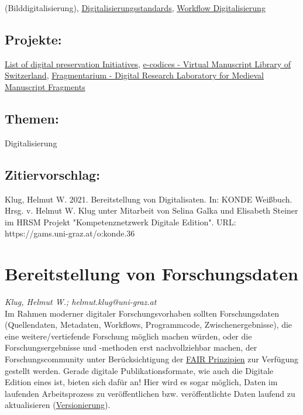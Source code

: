 \documentclass{article}
\begin{document}
{                           (Bilddigitalisierung)}, \href{https://gams.uni-graz.at/o:konde.64}{Digitalisierungsstandards}, \href{https://gams.uni-graz.at/archive/objects/context:konde/methods/sdef:Context/get?mode=workflow}{Workflow Digitalisierung}\subsection*{Projekte:}\href{https://en.wikipedia.org/wiki/List_of_digital_preservation_initiatives}{List of digital preservation Initiatives}, \href{https://www.e-codices.unifr.ch/en}{e-codices -
                           Virtual Manuscript Library of Switzerland}, \href{https://www.fragmentarium.ms}{Fragmentarium -
                           Digital Research Laboratory for Medieval Manuscript Fragments}\subsection*{Themen:}Digitalisierung\subsection*{Zitiervorschlag:}Klug, Helmut W. 2021. Bereitstellung von Digitalisaten. In: KONDE Weißbuch. Hrsg. v. Helmut W. Klug unter Mitarbeit von Selina Galka und Elisabeth Steiner im HRSM Projekt "Kompetenznetzwerk Digitale Edition". URL: https://gams.uni-graz.at/o:konde.36\newpage\section*{Bereitstellung von Forschungsdaten} \emph{Klug, Helmut W.; helmut.klug@uni-graz.at }\\
        
    Im Rahmen moderner digitaler Forschungsvorhaben sollten Forschungsdaten (Quellendaten, Metadaten, Workflows, Programmcode, Zwischenergebnisse), die eine weitere/vertiefende Forschung möglich machen würden, oder die Forschungsergebnisse und -methoden erst nachvollziehbar machen, der Forschungscommunity unter Berücksichtigung der \href{http://gams.uni-graz.at/o:konde.7}{FAIR Prinzipien} zur Verfügung gestellt werden. Gerade digitale Publikationsformate, wie auch die Digitale Edition eines ist, bieten sich dafür an! Hier wird es sogar möglich, Daten im laufenden Arbeitsprozess zu veröffentlichen bzw. veröffentlichte Daten laufend zu aktualisieren (\href{http://gams.uni-graz.at/o:konde.14}{Versionierung}). \\
            
\end{document}
